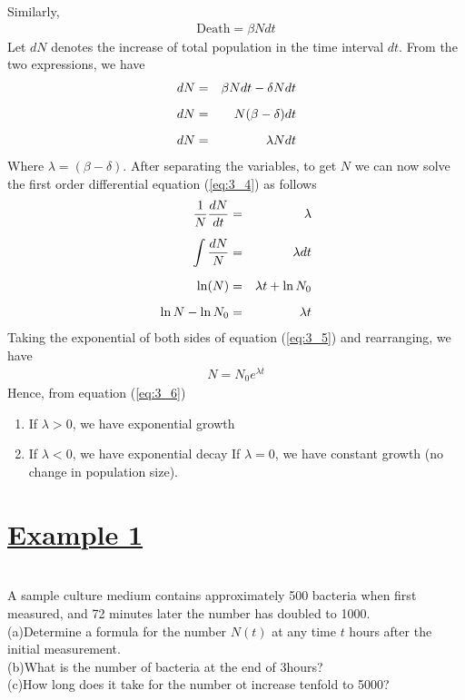 \documentclass[11pt]{report}
\newcommand{\ubt}[1]{\textbf{\underline{#1}}}
\newcommand{\sps}{\\[0.2cm]}
\newcommand{\spn}[1]{\\[#1cm]}
\newcommand{\refn}[1]{(\ref{#1})}
\newcommand{\refx}[1]{\refn{eq:#1}}
\newcommand{\NI}{\noindent}
\newcommand{\example}[1]{\section*{\ubt{Example #1}}{~}\spn{-1}}
\renewcommand{\labelenumi}{\arabic{enumi})}
\begin{document}
	\NI Similarly,
	\begin{eqnarray}
		\text{Death} = \beta N dt
	\end{eqnarray}
	Let $dN$ denotes the increase of total population in the time interval $dt$. From the two expressions, we have
	\begin{eqnarray}
		dN &=& \beta Ndt - \delta N dt\notag\sps
		dN &=& N(\beta-\delta)dt\notag\sps
		dN &=& \lambda N dt\label{eq:3_4}
	\end{eqnarray}
	Where $\lambda = (\beta-\delta)$. After separating the variables, to get $N$ we can now solve the first order differential equation \refx{3_4} as follows
	\begin{eqnarray}
		\frac{1}{N}\frac{dN}{dt} &=& \lambda\notag\sps
		\int\frac{dN}{N} &=& \lambda dt\notag\sps
		\ln(N) &=& \lambda t + \ln N_0\notag\sps
		\ln N - \ln N_0 &=& \lambda t \label{eq:3_5}
	\end{eqnarray}
	Taking the exponential of both sides of equation \refx{3_5} and rearranging, we have
	\begin{eqnarray}
		N = N_0 e^{\lambda t}\label{eq:3_6}
	\end{eqnarray}
	Hence, from equation \refx{3_6}
	\begin{enumerate}
		\renewcommand{\labelenumi}{\arabic{enumi}).}
		\item If $\lambda>0$, we have exponential growth
		\item  If $\lambda < 0$, we have exponential decay
		If $\lambda=0$, we have constant growth (no change in population size).
	\end{enumerate}
	
	\example{1}
	A sample culture medium contains approximately 500 bacteria when first measured, and 72 minutes later the number has doubled to 1000.\sps
	(a)Determine a formula for the number $N(t)$ at any time $t$ hours after the initial measurement.\\
	(b)What is the number of bacteria at the end of 3hours?\\
	(c)How long does it take for the number ot increase tenfold to 5000?
	
\end{document}
